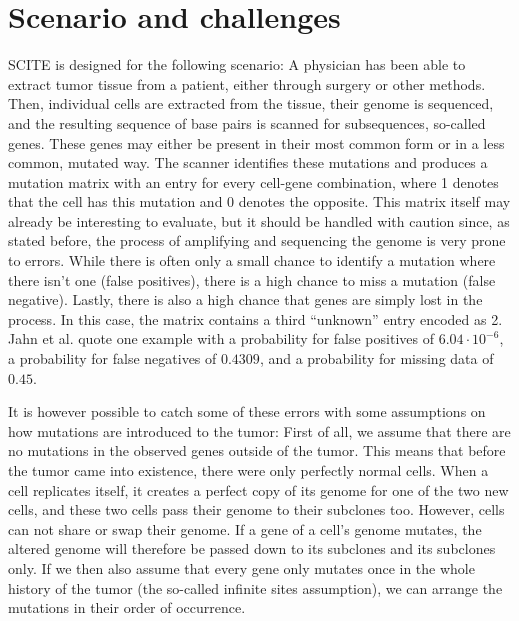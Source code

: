 \section{Scenario and challenges}
\label{sec:scenario}

\ac{SCITE} is designed for the following scenario: A physician has been able to extract tumor tissue from a patient, either through surgery or other methods. Then, individual cells are extracted from the tissue, their genome is sequenced, and the resulting sequence of base pairs is scanned for subsequences, so-called genes. These genes may either be present in their most common form or in a less common, mutated way. The scanner identifies these mutations and produces a mutation matrix with an entry for every cell-gene combination, where 1 denotes that the cell has this mutation and 0 denotes the opposite. This matrix itself may already be interesting to evaluate, but it should be handled with caution since, as stated before, the process of amplifying and sequencing the genome is very prone to errors. While there is often only a small chance to identify a mutation where there isn't one (false positives), there is a high chance to miss a mutation (false negative). Lastly, there is also a high chance that genes are simply lost in the process. In this case, the matrix contains a third ``unknown'' entry encoded as 2. Jahn et al. \cite{tree2016} quote one example with a probability for false positives of $6.04 \cdot 10^{-6}$, a probability for false negatives of $0.4309$, and a probability for missing data of $0.45$.

It is however possible to catch some of these errors with some assumptions on how mutations are introduced to the tumor: First of all, we assume that there are no mutations in the observed genes outside of the tumor. This means that before the tumor came into existence, there were only perfectly normal cells. When a cell replicates itself, it creates a perfect copy of its genome for one of the two new cells, and these two cells pass their genome to their subclones too. However, cells can not share or swap their genome. If a gene of a cell's genome mutates, the altered genome will therefore be passed down to its subclones and its subclones only. If we then also assume that every gene only mutates once in the whole history of the tumor (the so-called infinite sites assumption), we can arrange the mutations in their order of occurrence.

